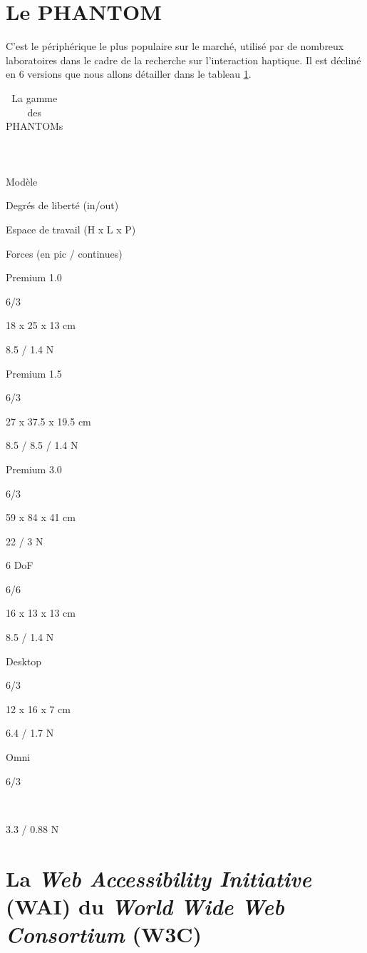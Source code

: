 \documentclass[
]{book}
\begin{document}
\hypertarget{le-phantom}{%
\section{Le PHANTOM}\label{le-phantom}}

C'est le périphérique le plus populaire sur le marché, utilisé par de
nombreux laboratoires dans le cadre de la recherche sur l'interaction
haptique. Il est décliné en 6 versions que nous allons détailler dans le
tableau \ref{tab:phantoms}.

\begin{longtable}[]{@{}l@{}}
\caption{\label{tab:phantoms} La gamme des PHANTOMs}\tabularnewline
\toprule()
\endhead
\bottomrule()
\end{longtable}

~

Modèle

Degrés de liberté (in/out)

Espace de travail (H x L x P)

Forces (en pic / continues)

Premium 1.0

6/3

18 x 25 x 13 cm

8.5 / 1.4 N

Premium 1.5

6/3

27 x 37.5 x 19.5 cm

8.5 / 8.5 / 1.4 N

Premium 3.0

6/3

59 x 84 x 41 cm

22 / 3 N

6 DoF

6/6

16 x 13 x 13 cm

8.5 / 1.4 N

Desktop

6/3

12 x 16 x 7 cm

6.4 / 1.7 N

Omni

6/3

~

3.3 / 0.88 N

\hypertarget{accessibilite}{%
\section{\texorpdfstring{La \emph{Web Accessibility Initiative} (WAI) du \emph{World Wide Web Consortium} (W3C)}{La Web Accessibility Initiative (WAI) du World Wide Web Consortium (W3C)}}\label{accessibilite}}
\end{document}
